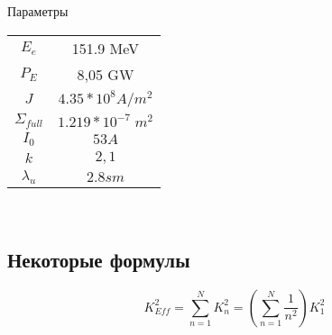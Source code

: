 \documentclass[12pt]{article}
\title{}
\date{}
\author{}
\begin{document}
\begin{center}
Параметры\\
	\begin{tabular}{| c | c |}
		\hline
		$E_e$ & 151.9 MeV \\
		$P_E$ & 8,05 GW \\
		$J$ & $4.35*10^8 A/m^2$ \\
		$\Sigma_{full}$ & $1.219*10^{-7} \; m^2$\\
		$I_0$ & $53 A$\\
		$k$ & $2,1$\\
		$\lambda_{u}$ & $2.8 sm$\\
		\hline
	\end{tabular}\\
\end{center}
	\subsection{Некоторые формулы}
	\begin{equation}
		K^2_{Eff}=\sum_{n=1}^{N} K_n^2 = \left( \sum_{n=1}^{N} \frac{1}{n^2} \right) K_1^2
	\end{equation}
\end{document}
